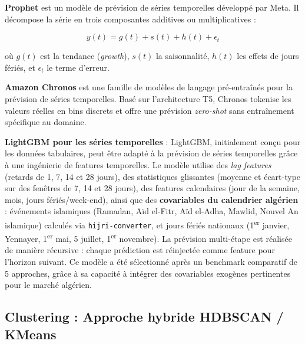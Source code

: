 \documentclass[12pt,a4paper]{report}
\begin{document}
\textbf{Prophet} \cite{taylor2018forecasting} est un mod\`{e}le de pr\'{e}vision de s\'{e}ries temporelles d\'{e}velopp\'{e} par Meta. Il d\'{e}compose la s\'{e}rie en trois composantes additives ou multiplicatives :

\begin{equation}
y(t) = g(t) + s(t) + h(t) + \epsilon_t
\end{equation}

o\`{u} $g(t)$ est la tendance (\textit{growth}), $s(t)$ la saisonnalit\'{e}, $h(t)$ les effets de jours f\'{e}ri\'{e}s, et $\epsilon_t$ le terme d'erreur.

\textbf{Amazon Chronos} \cite{ansari2024chronos} est une famille de mod\`{e}les de langage pr\'{e}-entra\^{i}n\'{e}s pour la pr\'{e}vision de s\'{e}ries temporelles. Bas\'{e} sur l'architecture T5, Chronos tokenise les valeurs r\'{e}elles en bins discrets et offre une pr\'{e}vision \textit{zero-shot} sans entra\^{i}nement sp\'{e}cifique au domaine.

\textbf{LightGBM pour les s\'{e}ries temporelles} \cite{ke2017lightgbm} : LightGBM, initialement con\c{c}u pour les donn\'{e}es tabulaires, peut \^{e}tre adapt\'{e} \`{a} la pr\'{e}vision de s\'{e}ries temporelles gr\^{a}ce \`{a} une ing\'{e}nierie de features temporelles. Le mod\`{e}le utilise des \textit{lag features} (retards de 1, 7, 14 et 28 jours), des statistiques glissantes (moyenne et \'{e}cart-type sur des fen\^{e}tres de 7, 14 et 28 jours), des features calendaires (jour de la semaine, mois, jours f\'{e}ri\'{e}s/week-end), ainsi que des \textbf{covariables du calendrier alg\'{e}rien} : \'{e}v\'{e}nements islamiques (Ramadan, A\"{i}d el-Fitr, A\"{i}d el-Adha, Mawlid, Nouvel An islamique) calcul\'{e}s via \texttt{hijri-converter}, et jours f\'{e}ri\'{e}s nationaux (1\textsuperscript{er} janvier, Yennayer, 1\textsuperscript{er} mai, 5 juillet, 1\textsuperscript{er} novembre). La pr\'{e}vision multi-\'{e}tape est r\'{e}alis\'{e}e de mani\`{e}re r\'{e}cursive : chaque pr\'{e}diction est r\'{e}inject\'{e}e comme feature pour l'horizon suivant. Ce mod\`{e}le a \'{e}t\'{e} s\'{e}lectionn\'{e} apr\`{e}s un benchmark comparatif de 5 approches, gr\^{a}ce \`{a} sa capacit\'{e} \`{a} int\'{e}grer des covariables exog\`{e}nes pertinentes pour le march\'{e} alg\'{e}rien.

\subsection{Clustering : Approche hybride HDBSCAN / KMeans}
\end{document}
